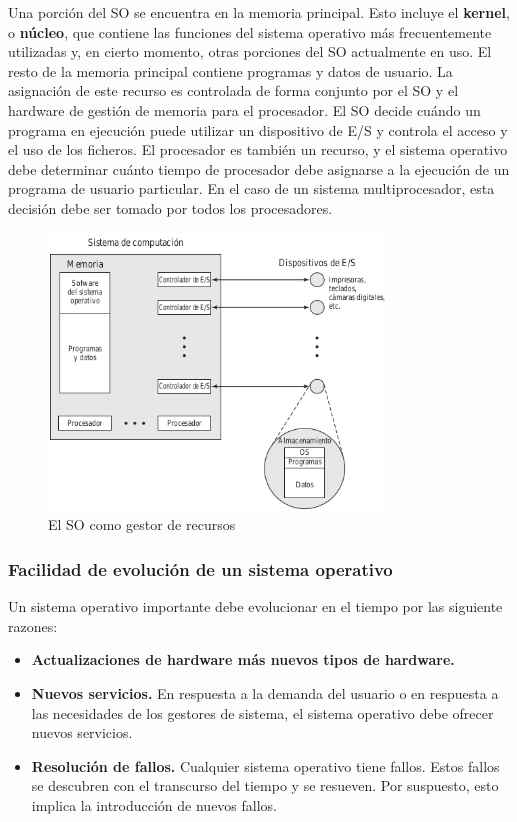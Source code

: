\documentclass{article}
\begin{document}
					Una porción del SO se encuentra en la memoria principal. Esto incluye el \textbf{kernel}, o \textbf{núcleo}, que contiene las funciones del sistema operativo más frecuentemente utilizadas y, en cierto momento, otras porciones del SO actualmente en uso. El resto de la memoria principal contiene programas y datos de usuario. La asignación de este recurso es controlada de forma conjunto por el SO y el hardware de gestión de memoria para el procesador.	El SO decide cuándo un programa en ejecución puede utilizar un dispositivo de E/S y controla el acceso y el uso de los ficheros. El procesador es también un recurso, y el sistema operativo debe determinar cuánto tiempo de procesador debe asignarse a la ejecución de un programa de usuario particular. En el caso de un sistema multiprocesador, esta decisión debe ser tomado por todos los procesadores. \\
										
					\begin{figure}
					\caption{El SO como gestor de recursos}
					\label{figura15:gestor_recursos}
					\centering
					\includegraphics[width=0.8\textwidth, scale=1]{figura15.png}
					\end{figure}
					
				\subsubsection{Facilidad de evolución de un sistema operativo}
					Un sistema operativo importante debe evolucionar en el tiempo por las siguiente razones:
						
						\begin{itemize}
						\item \textbf{Actualizaciones de hardware más nuevos tipos de hardware.}
						\item \textbf{Nuevos servicios.} En respuesta a la demanda del usuario o en respuesta a las necesidades de los gestores de sistema, el sistema operativo debe ofrecer nuevos servicios.
						\item \textbf{Resolución de fallos.} Cualquier sistema operativo tiene fallos. Estos fallos se descubren con el transcurso del tiempo y se resueven. Por suspuesto, esto implica la introducción de nuevos fallos.
						\end{itemize}
						
\end{document}
